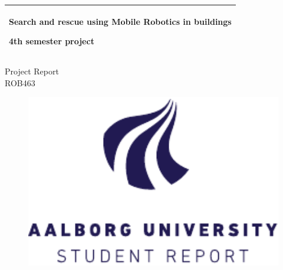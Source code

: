%
%
%
%
%
\begin{titlepage}
  \addtolength{\hoffset}{0.5\evensidemargin-0.5\oddsidemargin} %
  \noindent%
  \begin{tabular}{@{}p{\textwidth}@{}}
    \toprule[2pt]
    \midrule
    \vspace{0.2cm}
    \begin{center}
    \Huge{\textbf{
    Search and rescue using Mobile Robotics in buildings
    }}
    \end{center}
    \begin{center}
      \Large{
       4th semester project
      }
    \end{center}
    \vspace{0.2cm}\\
    \midrule
    \toprule[2pt]
  \end{tabular}
  \begin{center}
    {\large
      Project Report%
    }\\
    \vspace{0.2cm}
    {\Large
      ROB463%
    }
  \vspace{8mm}
 
\begin{figure}[H]
    \centering
    \includegraphics[width=1\textwidth]{figures/formalities/aau_logo_en.pdf}
\end{figure}
  

\end{center}
\end{titlepage}
